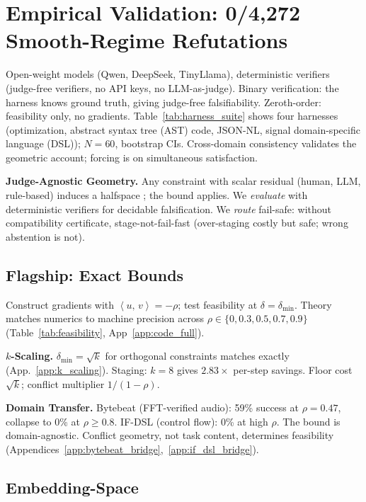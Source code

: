 \documentclass{article}
\theoremstyle{plain}
\theoremstyle{definition}
\theoremstyle{remark}
\newcommand{\ip}[2]{\left\langle #1,\, #2 \right\rangle}
\newcommand{\appref}[1]{App.~\ref{#1}}
\begin{document}
\section{Empirical Validation: 0/4{,}272 Smooth-Regime Refutations}\label{sec:empirical}

Open-weight models (Qwen, DeepSeek, TinyLlama), deterministic verifiers (judge-free verifiers, no API keys, no LLM-as-judge). Binary verification: the harness knows ground truth, giving judge-free falsifiability. Zeroth-order: feasibility only, no gradients. Table~\ref{tab:harness_suite} shows four harnesses (optimization, abstract syntax tree (AST) code, JSON-NL, signal domain-specific language (DSL)); $N{=}60$, bootstrap CIs. Cross-domain consistency validates the geometric account; forcing is on simultaneous satisfaction.

\noindent\textbf{Judge-Agnostic Geometry.} Any constraint with scalar residual (human, LLM, rule-based) induces a halfspace \citep{fliege2000steepest}; the bound applies. We \emph{evaluate} with deterministic verifiers for decidable falsification. We \emph{route} fail-safe: without compatibility certificate, stage-not-fail-fast \citep{anthropic2025constitution} (over-staging costly but safe; wrong abstention is not).

\subsection{Flagship: Exact Bounds}\label{sec:ground_truth}

Construct gradients with $\ip{u}{v} = -\rho$; test feasibility at $\delta = \delta_{\min}$. Theory matches numerics to machine precision across $\rho \in \{0, 0.3, 0.5, 0.7, 0.9\}$ (Table~\ref{tab:feasibility}, App~\ref{app:code_full}).

\textbf{$k$-Scaling.}
$\delta_{\min} = \sqrt{k}$ for orthogonal constraints matches exactly (\appref{app:k_scaling}). Staging: $k{=}8$ gives $2.83\times$ per-step savings. Floor cost $\sqrt{k}$; conflict multiplier $1/(1{-}\rho)$.

\textbf{Domain Transfer.}
Bytebeat (FFT-verified audio): 59\% success at $\rho{=}0.47$, collapse to 0\% at $\rho \ge 0.8$. IF-DSL (control flow): 0\% at high $\rho$. The bound is domain-agnostic. Conflict geometry, not task content, determines feasibility (Appendices~\ref{app:bytebeat_bridge},~\ref{app:if_dsl_bridge}).

\subsection{Embedding-Space}\label{sec:multisystem}
\end{document}
